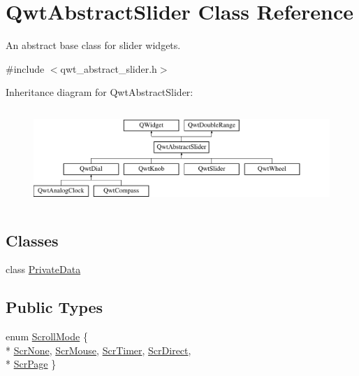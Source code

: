 \hypertarget{class_qwt_abstract_slider}{\section{Qwt\-Abstract\-Slider Class Reference}
\label{class_qwt_abstract_slider}
}


An abstract base class for slider widgets.  




{\ttfamily \#include $<$qwt\-\_\-abstract\-\_\-slider.\-h$>$}

Inheritance diagram for Qwt\-Abstract\-Slider\-:\begin{figure}[H]
\begin{center}
\leavevmode
\includegraphics[height=3.672131cm]{class_qwt_abstract_slider}
\end{center}
\end{figure}
\subsection*{Classes}
\begin{DoxyCompactItemize}
\item 
class \hyperlink{class_qwt_abstract_slider_1_1_private_data}{Private\-Data}
\end{DoxyCompactItemize}
\subsection*{Public Types}
\begin{DoxyCompactItemize}
\item 
enum \hyperlink{class_qwt_abstract_slider_ae4c0c4844ac6a35356f3c529a8eae154}{Scroll\-Mode} \{ \\*
\hyperlink{class_qwt_abstract_slider_ae4c0c4844ac6a35356f3c529a8eae154a807ce5a253287dc7baf7a9c3661b35c1}{Scr\-None}, 
\hyperlink{class_qwt_abstract_slider_ae4c0c4844ac6a35356f3c529a8eae154a3b131974e6816c1f1e3223b2976f7e50}{Scr\-Mouse}, 
\hyperlink{class_qwt_abstract_slider_ae4c0c4844ac6a35356f3c529a8eae154a0c20ad978c3bb2e833a476b3d8b3cecc}{Scr\-Timer}, 
\hyperlink{class_qwt_abstract_slider_ae4c0c4844ac6a35356f3c529a8eae154a0c6c0f8bc0fc62cf6e5b00cd0e5729e3}{Scr\-Direct}, 
\\*
\hyperlink{class_qwt_abstract_slider_ae4c0c4844ac6a35356f3c529a8eae154a9e18dc0c7c8afdfbec8d0962144d971e}{Scr\-Page}
 \}
\end{DoxyCompactItemize}
